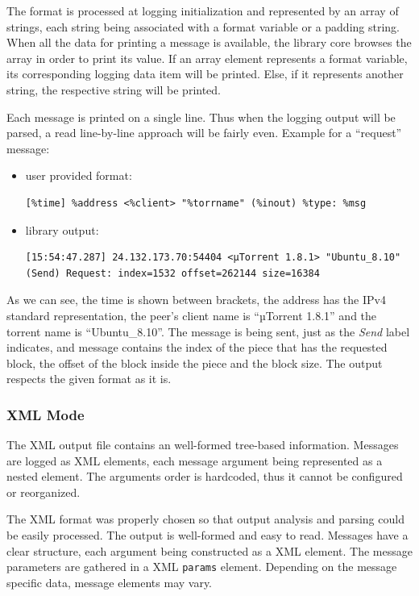 The format is processed at logging initialization and represented by an array
of strings, each string being associated with a format variable or a padding
string. When all the data for printing a message is available, the library
core browses the array in order to print its value. If an array element
represents a format variable, its corresponding logging data item will be
printed. Else, if it represents another string, the respective string will be
printed.

Each message is printed on a single line. Thus when the logging output will be
parsed, a read line-by-line approach will be fairly even. Example for a
``request'' message:

\begin{itemize}
  \item user provided format:
    \begin{verbatim}
[%time] %address <%client> "%torrname" (%inout) %type: %msg
    \end{verbatim}
  \item library output:
    \begin{verbatim}
[15:54:47.287] 24.132.173.70:54404 <µTorrent 1.8.1> "Ubuntu_8.10"
(Send) Request: index=1532 offset=262144 size=16384
    \end{verbatim}
\end{itemize}

As we can see, the time is shown between brackets, the address has the IPv4
standard representation, the peer's client name is ``µTorrent 1.8.1'' and the
torrent name is ``Ubuntu\_8.10''. The message is being sent, just as the
\textit{Send} label indicates, and message contains the index of the piece
that has the requested block, the offset of the block inside the piece and the
block size.  The output respects the given format as it is.

\subsubsection{XML Mode}

The XML output file contains an well-formed tree-based information. Messages
are logged as XML elements, each message argument being represented as a
nested element. The arguments order is hardcoded, thus it cannot be configured
or reorganized.

The XML format was properly chosen so that output analysis and parsing could
be easily processed. The output is well-formed and easy to read. Messages have
a clear structure, each argument being constructed as  a XML element. The
message parameters are gathered in a XML \texttt{params} element. Depending on
the message specific data, message elements may vary.

